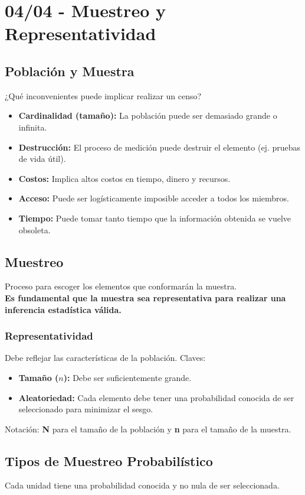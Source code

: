 \documentclass[12pt, letterpaper]{article}
\begin{document}
\section{04/04 - Muestreo y Representatividad}
\subsection{Población y Muestra}
¿Qué inconvenientes puede implicar realizar un censo?
\begin{itemize}
	\item \textbf{Cardinalidad (tamaño):} La población puede ser demasiado grande o infinita.
	\item \textbf{Destrucción:} El proceso de medición puede destruir el elemento (ej. pruebas de vida útil).
	\item \textbf{Costos:} Implica altos costos en tiempo, dinero y recursos.
	\item \textbf{Acceso:} Puede ser logísticamente imposible acceder a todos los miembros.
	\item \textbf{Tiempo:} Puede tomar tanto tiempo que la información obtenida se vuelve obsoleta.
\end{itemize}

\subsection{Muestreo}
Proceso para escoger los elementos que conformarán la muestra. \\
\textbf{Es fundamental que la muestra sea representativa para realizar una inferencia estadística válida.}

\subsubsection{Representatividad}
Debe reflejar las características de la población. Claves:
\begin{itemize}
	\item \textbf{Tamaño ($n$):} Debe ser suficientemente grande.
	\item \textbf{Aleatoriedad:} Cada elemento debe tener una probabilidad conocida de ser seleccionado para minimizar el sesgo.
\end{itemize}
Notación: \textbf{N} para el tamaño de la población y \textbf{n} para el tamaño de la muestra.

\subsection{Tipos de Muestreo Probabilístico}
Cada unidad tiene una probabilidad conocida y no nula de ser seleccionada.
\end{document}
